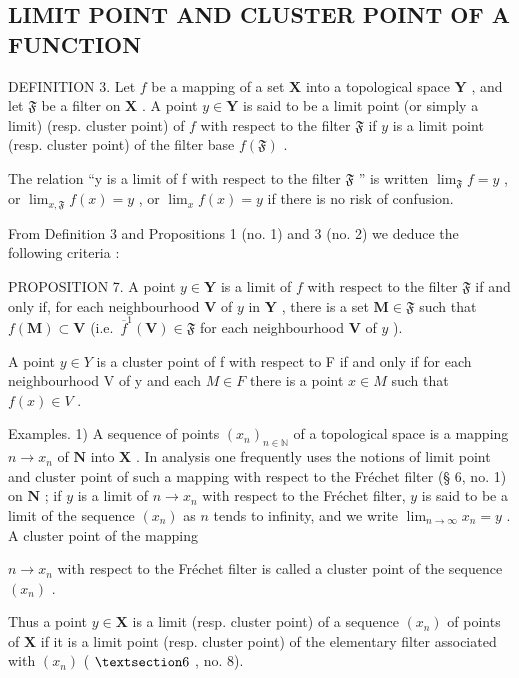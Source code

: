 \subsection{LIMIT POINT AND CLUSTER POINT OF A FUNCTION}

DEFINITION 3. Let \(f\) be a mapping of a set \(\mathbf{X}\) into a topological space \(\mathbf{Y}\) , and let \(\mathfrak{F}\) be a filter on \(\mathbf{X}\) . A point \(y \in \mathbf{Y}\) is said to be a limit point (or simply a limit) (resp. cluster point) of \(f\) with respect to the filter \(\mathfrak{F}\) if \(y\) is a limit point (resp. cluster point) of the filter base \(f(\mathfrak{F})\) .

The relation ``y is a limit of f with respect to the filter \(\mathfrak{F}\) '' is written \(\lim_{\mathfrak{F}} f = y\) , or \(\lim_{x, \mathfrak{F}} f(x) = y\) , or \(\lim_{x} f(x) = y\) if there is no risk of confusion.

From Definition 3 and Propositions 1 (no. 1) and 3 (no. 2) we deduce the following criteria :

PROPOSITION 7. A point \(y \in \mathbf{Y}\) is a limit of \(f\) with respect to the filter \(\mathfrak{F}\) if and only if, for each neighbourhood \(\mathbf{V}\) of \(y\) in \(\mathbf{Y}\) , there is a set \(\mathbf{M} \in \mathfrak{F}\) such that \(f(\mathbf{M}) \subset \mathbf{V}\) (i.e.~\(\overline{f}^{1}(\mathbf{V}) \in \mathfrak{F}\) for each neighbourhood \(\mathbf{V}\) of \(y\) ).

A point \(y \in Y\) is a cluster point of f with respect to F if and only if for each neighbourhood V of y and each \(M \in F\) there is a point \(x \in M\) such that \(f(x) \in V\) .

Examples. 1) A sequence of points \((x_{n})_{n\in \mathbb{N}}\) of a topological space is a mapping \(n\to x_n\) of \(\mathbf{N}\) into \(\mathbf{X}\) . In analysis one frequently uses the notions of limit point and cluster point of such a mapping with respect to the Fréchet filter (§ 6, no. 1) on \(\mathbf{N}\) ; if \(y\) is a limit of \(n\to x_{n}\) with respect to the Fréchet filter, \(y\) is said to be a limit of the sequence \((x_{n})\) as \(n\) tends to infinity, and we write \(\lim_{n\to \infty}x_n = y\) . A cluster point of the mapping

\(n \to x_{n}\) with respect to the Fréchet filter is called a cluster point of the sequence \((x_{n})\) .

Thus a point \(y \in \mathbf{X}\) is a limit (resp. cluster point) of a sequence \((x_n)\) of points of \(\mathbf{X}\) if it is a limit point (resp. cluster point) of the elementary filter associated with \((x_n)\) ( \(\S 6\) , no. 8).

